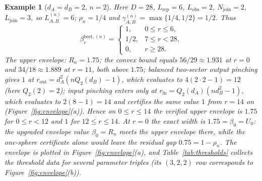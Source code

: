 \documentclass[11pt,a4paper]{article}
\newtheorem{example}[theorem]{Example}
\begin{document}
\begin{example}[$d_A=d_B=2$, $n=2$]
\label{ex:222}
Here $D=28$, $L_{\mathrm{rep}}=6$, $L_{\mathrm{obs}}=2$, $N_{\mathrm{join}}=2$, $L_{\mathrm{join}}=3$, so $L_{A,B}^{(n)}=6$; $\rho_n=1/4$ and $\gamma_{A,B}^{(n)}=\max\{1/4,1/2\}=1/2$. Thus
\[
\beta_r^{\mathrm{best},(n)}=
\begin{cases}
1,&0\le r\le6,\\
1/2,&7\le r<28,\\
0,&r\ge28.
\end{cases}
\]
The upper envelope: $R_n=1.75$; the convex bound equals $56/29\approx1.931$ at $r=0$ and $34/18\approx1.889$ at $r=11$, both above $1.75$; balanced two-sector output pinching gives $1$ at $r_{\mathrm{out}}=d_A^2(nQ_2(d_B)-1)$, which evaluates to $4(2\cdot2-1)=12$ (here $Q_2(2)=2$); input pinching enters only at $r_{\mathrm{in}}=Q_2(d_A)(nd_B^2-1)$, which evaluates to $2(8-1)=14$ and certifies the same value $1$ from $r=14$ on (Figure~\ref{fig:envelope}(a)). Hence on $0\le r\le14$ the verified upper envelope is $1.75$ for $0\le r<12$ and $1$ for $12\le r\le14$. At $r=0$ the exact width is $1.75=\beta_0=U_0$: the upgraded envelope value $\beta_0=R_n$ meets the upper envelope there, while the one-sphere certificate alone would leave the residual gap $0.75=1-\rho_n$. The envelope is plotted in Figure~\ref{fig:envelope}(a), and Table~\ref{tab:thresholds} collects the threshold data for several parameter triples (its $(3,2,2)$ row corresponds to Figure~\ref{fig:envelope}(b)).
\end{example}
\end{document}
